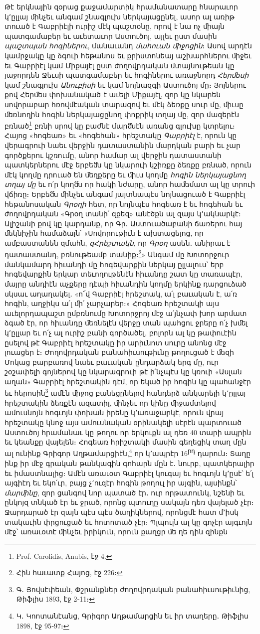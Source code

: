 \documentclass{article}
\begin{document}
{Թէ երկնային զօրաց քաջամարտիկ հրամանատարը հնարաւոր կ՚ըլլայ ﬕնչեւ անգամ շնագլուխ ներկայացընել, ասոր ալ առիթ տուած է Գաբրիէլի ուրիշ մէկ պաշտօնը, որով է նա ոչ ﬕայն պատգամաբեր եւ աւետաւոր Աստուծոյ, այլեւ ըստ մասին \emph{պաշտպան հոգիներու}, մանաւանդ \emph{մահուան ﬕջոցին}։ Ասով արդէն կամրջակը կը ձգուի հեթանոս եւ քրիստոնեայ աշխարհներու ﬕջեւ եւ Գաբրիէլ կամ Միքայէլ ըստ ժողովրդական մտայնութեան կը յաջորդեն Ջեւսի պատգամաբեր եւ հոգիներու առաջնորդ \emph{Հերﬔսի} կամ շնագլուխ \emph{Անուբիսի} եւ կամ նոյնազգի Աստուծոյ մը։ Յոյներու քով Հերﬔս փոխանակած է աւելի Միքայէլ, զոր կը նկարեն սովորաբար հռովմէական տարազով եւ մէկ ձեռքը սուր մը, ﬕւսը ﬔռնողին հոգին ներկայացընող փոքրիկ տղայ մը, զոր մազերէն բռնած\footnote{Prof. Carolidis, Anubis, էջ 4.} բռնի սրով կը բաժնէ մարﬓէն առանց գլուխը կտրելու։ Հայոց «հոգեառ» եւ «հոգեհան» հրեշտակը \emph{Գաբրիէլ} է, որուն կը վերագրուի նաեւ վերջին դատաստանին մարդկան բարի եւ չար գործքերու կշռումը, անոր համար ալ վերջին դատաստանի պատկերներու մէջ երբեﬓ կը նկարուի կշիռքը ձեռքը բռնած, որուն մէկ կողմը դրուած են ﬔղքերը եւ ﬕւս կողմը \emph{հոգին ներկայացնող տղայ մը} եւ ո՛ր կողﬓ որ հակի նժարը, անոր հաﬔմատ ալ կը տրուի վճիռը։ Երբեﬓ ﬕնչեւ անգամ յայտնապէս նոյնացուած է Գաբրիէլ հեթանոսական \emph{Գրօղի} հետ, որ նոյնպէս հոգեառ է եւ հոգեհան եւ ժողովրդական «Գրօղ տանի՛ զքեզ» անէծքն ալ զայս կ՚ակնարկէ։ Ալիշանի քով կը կարդանք, որ Գր․ Աստուածաբանի ճառերու հայ ﬔկնիչին համաձայն՝ «Սովորութիւն է ախտացելոց, որ ամբաստանեն զմահն, \emph{զՀրեշտակն}, որ \emph{Գրօղ} ասեն․ անիրաւ է դատաստանդ, բռնութեամբ տանիք։\footnote{Հին հաւատք Հայոց, էջ 226։}» Անգամ մը Խոտորջուր մանկամարդ հիւանդի մը հոգեվարքին ներկայ ըլլալուս՝ երբ հոգեվարքին երկար տեւողութենէն հիւանդը շատ կը տառապէր, մայրը անդիէն աչքերը դէպի հիւանդին կողմը երկինք դարցուձած սկսաւ աղաղակել․ «ո՜վ Գաբրիէլ հրեշտակ, ա՛լ բաւական է, ա՛ռ հոգին, աղջիկս ա՛լ ﬕ՛ չարչարեր։» Հոգեառ հրեշտակի այս աւելորդապաշտ ըմբռնումը Խոտորջրոյ մէջ ա՛յնչափ խոր արմատ ձգած էր, որ հիւանդը ﬔռնելէն վերջը տան պահցու ջրերը ո՛չ խﬔլ կ՚ըլլար եւ ո՛չ ալ ուրիշ բանի գործածել, բոլորն ալ կը թափուէին ըսելով թէ Գաբրիէլ հրեշտակը իր արիւնոտ սուրը անոնց մէջ լուացեր է։ Ժողովրդական բանահիւսութիւնը թողուցած է ﬔզի Մոկաց բարբառով նաեւ բաւական ընդարձակ երգ մը, ուր շօշափելի գոյներով կը նկարագրուի թէ ի՛նչպէս կը կռուի «Ասլան աղան» Գաբրիէլ հրեշտակին դէմ, որ եկած իր հոգին կը պահանջէր եւ հերոսին\footnote{Գ․ Յովսէփեան, Փշրանքներ ժողովրդական բանահիւսութիւնից, Թիֆլիս 1893, էջ 2֊11։} ամէն ﬕջոց բանեցընելով հանդերձ անկարելի կ՚ըլլայ հրեշտակին ձեռքէն ազատիլ, ﬕնչեւ որ կինը ﬕջամտելով ամուսնոյն հոգւոյն փոխան իրենը կ՚առաջարկէ, որուն վրայ հրեշտակը կնոջ այս ամուսնական օրինակելի սէրէն պարտուած Աստուծոյ հրամանաւ կը թողու որ երկուքն ալ դեռ 40 տարի ապրին եւ կեանքը վայելեն։ Հոգեառ հրիշտակի մասին գեղեցիկ տաղ մըն ալ ունինք Գրիգոր Աղթամարցիէն,\footnote{Կ․ Կոոտանէանց, Գրիգոր Աղթամարցին եւ իր տաղերը․ Թիֆլիս 1898, էջ 95֊97։} որ կ՚ապրէր 16\textsuperscript{րդ} դարուն։ Տաղը ինք իր մէջ գրական թանկագին գոհարն մըն է․ նուրբ, պատկերալիր եւ իմաստնալից։ Ամէն առաւօտ Գաբրիէլ կուգայ եւ հոգւոյն կ՚ըսէ՝ ե՛լ այգիէդ եւ եկո՛ւր, բայց չ՚ուզէր հոգին թողուլ իր այգին, այսինքն՝ \emph{մարﬕնը}, զոր ցանգով նոր պատած էր․ ուր որթատունկ, նշենի եւ ընկոյզ տնկած էր եւ ջրած, որոնց պտուղը սակայն դեռ վայելած չէր։ Ջարդարած էր զայն պէս պէս ծաղիկներով, որոնցմէ հատ մ՚իսկ տակաւին փրցուցած եւ հոտոտած չէր։ Պլպուլն ալ կը գոչէր այգւոյն մէջ՝ առաւօտէ ﬕնչեւ իրիկուն, որուն քաղցր ﬔ ղե դին զինքն }
\end{document}
